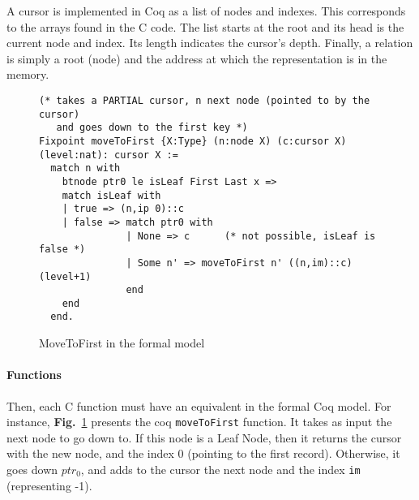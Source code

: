 A cursor is implemented in Coq as a list of nodes and indexes.
This corresponds to the arrays found in the C code. The list starts at the root and its head is the current node and index.
Its length indicates the cursor's depth.
Finally, a relation is simply a root (node) and the address at which the representation is in the memory.%

\begin{figure}
\begin{lstlisting}
(* takes a PARTIAL cursor, n next node (pointed to by the cursor)
   and goes down to the first key *)
Fixpoint moveToFirst {X:Type} (n:node X) (c:cursor X) (level:nat): cursor X :=
  match n with
    btnode ptr0 le isLeaf First Last x =>
    match isLeaf with
    | true => (n,ip 0)::c
    | false => match ptr0 with
               | None => c      (* not possible, isLeaf is false *)
               | Some n' => moveToFirst n' ((n,im)::c) (level+1)
               end
    end
  end.
\end{lstlisting}
\label{fig:movetofirst}
\caption{MoveToFirst in the formal model}
\end{figure}  

\paragraph{Functions} Then, each C function must have an equivalent in the formal Coq model.
For instance, \textbf{Fig.}~\ref{fig:movetofirst} presents the coq \texttt{moveToFirst} function.
It takes as input the next node to go down to. If this node is a Leaf Node, then it returns the cursor with the new node, and the index 0 (pointing to the first record).
Otherwise, it goes down $ptr_0$, and adds to the cursor the next node and the index \texttt{im} (representing -1).
